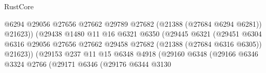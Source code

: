 \begin{lexlean}{RustCore}
\begin{coremodule}
                                                    @6294
                                                    @29056
                                                    @27656
                                                    @27662
                                                    @29789
                                                    @27682
                                                    (@21388 (@27684 @6294 @6281))
                                                    @21623))
                                                (@29438
                                                  @1480
                                                  @11
                                                  @16
                                                  @6321
                                                  @6350
                                                  (@29445
                                                    @6321
                                                    (@29451
                                                      @6304
                                                      @6316
                                                      @29056
                                                      @27656
                                                      @27662
                                                      @29458
                                                      @27682
                                                      (@21388 (@27684 @6316 @6305))
                                                      @21623))
                                                  (@29153
                                                    @237
                                                    @11
                                                    @15
                                                    @6348
                                                    @4918
                                                    (@29160
                                                      @6348
                                                      (@29166
                                                        @6346
                                                        @3324
                                                        @2766
                                                        (@29171
                                                          @6346
                                                          (@29176
                                                            @6344
                                                            @3130

\end{coremodule}
\end{lexlean}
